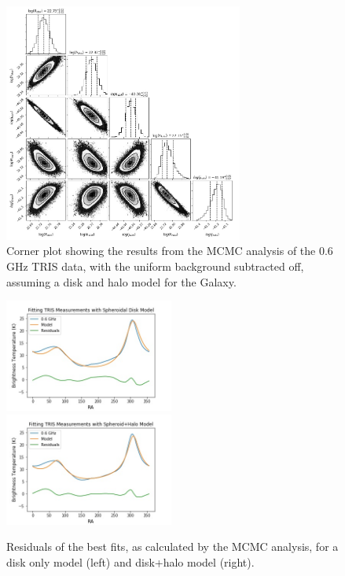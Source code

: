 \documentclass[%
onecolumn,
11pt,
tightenlines,
notitlepage,
superscriptaddress,
nofootinbib,
amsmath,amssymb,
aps,
pra,
]{revtex4-1}
\begin{document}
\begin{figure}[H]
\begin{center}
\includegraphics[width=0.7\textwidth]{corner_TRIS_sph+halo.jpg}
\caption{Corner plot showing the results from the MCMC analysis of the 0.6 GHz TRIS data, with the uniform background subtracted off, assuming a disk and halo model for the Galaxy.}
\label{corner_TRIS_sph+halo}
\end{center}
\end{figure}

\begin{figure}[t]
\begin{center}
\includegraphics[width=0.495\textwidth]{residuals_TRIS_sph.jpg}
\includegraphics[width=0.495\textwidth]{residuals_TRIS_sph+halo.jpg}
\caption{Residuals of the best fits, as calculated by the MCMC analysis, for a disk only model (left) and disk+halo model (right).}
\label{TRIS_MCMC}
\end{center}
\end{figure}
\end{document}
